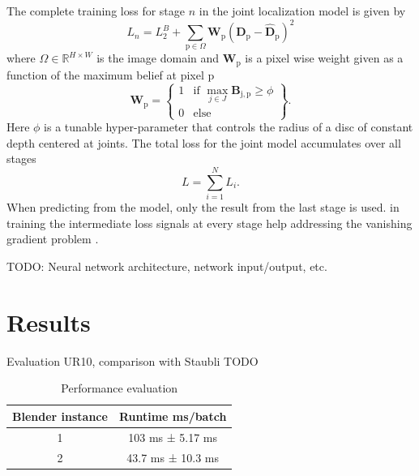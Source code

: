 \documentclass[conference]{IEEEtran}
\begin{document}
    The complete training loss for stage $n$ in the joint localization model is given by
    \begin{equation}
        L_n = L_2^B + \sum\limits_{\mathrm{p} \in \Omega}\mathbf{W}_{\mathrm{p}}\left(\mathbf{D}_{\mathrm{p}} - \hat{\mathbf{D}}_{\mathrm{p}}\right)^2
    \end{equation}
    where $\Omega \in \mathbb{R}^{H\times W}$ is the image domain and $\mathbf{W}_{\mathrm{p}}$ is a pixel wise weight given as a function of the maximum belief at pixel $\mathrm{p}$
    \begin{equation}
        \mathbf{W}_{\mathrm{p}} = \left\{
            \begin{array}{ll}
            1 & \textrm{if } \max\limits_{j\in{J}}{\mathbf{B}}_{\mathrm{j,p}} \ge \phi \\
            0 & \textrm{else}
            \end{array}
        \right\}.
    \end{equation}
    Here $\phi$ is a tunable hyper-parameter that controls the radius of a disc of constant depth centered at joints. The total loss for the joint model accumulates over all stages
    \begin{equation}
        L = \sum\limits_{i=1}^{N}L_i.
    \end{equation}
    When predicting from the model, only the result from the last stage is used. in training the intermediate loss signals at every stage help addressing the vanishing gradient problem \cite{wei2016convolutional}.

TODO: Neural network architecture, network input/output, etc.

\section{Results}

Evaluation UR10, comparison with Staubli
TODO

\begin{table}[htbp]
\caption{Performance evaluation}
\begin{center}
\begin{tabular}{|c|c|}
\hline
\textbf{Blender instance} & \textbf{Runtime ms/batch} \\
\hline
1 & 103 ms ± 5.17 ms \\
\hline
2 & 43.7 ms ± 10.3 ms \\
\hline
\end{tabular}
\label{tab1}
\end{center}
\end{table}
\end{document}
